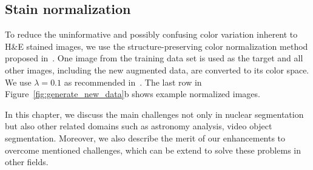 \subsection{Stain normalization}
To reduce the uninformative and possibly confusing color variation inherent to H\&E stained images, we use the structure-preserving color normalization method proposed in~\cite{7164042}.
One image from the training data set is used as the target and all other images, including the new augmented data, are converted to its color space.
We use $\lambda = 0.1$ as recommended in~\cite{7164042}.
The last row in Figure~\ref{fig:generate_new_data}b shows example normalized images.


\begin{ChapAbstract}
In this chapter, we discuss the main challenges not only in nuclear segmentation but also other related domains such as astronomy analysis, video object segmentation. Moreover, we also describe the merit of our enhancements to overcome mentioned challenges, which can be extend to solve these problems in other fields.
\end{ChapAbstract}
